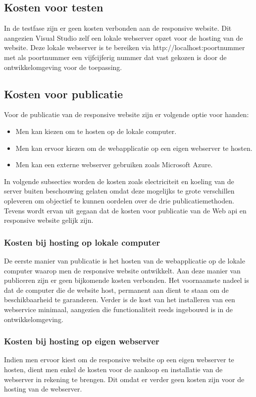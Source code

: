 \subsection{Kosten voor testen}
In de testfase zijn er geen kosten verbonden aan de responsive website. Dit aangezien Visual Studio zelf een lokale webserver opzet
voor de hosting van de website. Deze lokale webserver is te bereiken via http://localhost:poortnummer met als poortnummer een
vijfcijferig nummer dat vast gekozen is door de ontwikkelomgeving voor de toepassing.
\subsection{Kosten voor publicatie}
Voor de publicatie van de responsive website zijn er volgende optie voor handen:
\begin{itemize}
  \item Men kan kiezen om te hosten op de lokale computer.
  \item Men kan ervoor kiezen om de webapplicatie op een eigen webserver te hosten.
  \item Men kan een externe webserver gebruiken zoals Microsoft Azure.
\end{itemize}
In volgende subsecties worden de kosten zoals electriciteit en koeling van de server buiten beschouwing gelaten omdat deze
mogelijks te grote verschillen opleveren om objectief te kunnen oordelen over de drie publicatiemethoden. Tevens wordt ervan uit
gegaan dat de kosten voor publicatie van de Web api en responsive website gelijk zijn.
\subsubsection{Kosten bij hosting op lokale computer}
De eerste manier van publicatie is het hosten van de webapplicatie op de lokale computer waarop men de responsive website
ontwikkelt. Aan deze manier van publiceren zijn er geen bijkomende kosten verbonden. Het voornaamste nadeel is dat de computer
die de website host, permanent aan dient te staan om de beschikbaarheid te garanderen. Verder is de kost van het installeren
van een webservice minimaal, aangezien die functionaliteit reeds ingebouwd is in de ontwikkelomgeving.
\newpage
\subsubsection{Kosten bij hosting op eigen webserver}
Indien men ervoor kiest om de responsive website op een eigen webserver te hosten, dient men enkel de kosten voor de aankoop en installatie van de webserver in rekening te brengen.
Dit omdat er verder geen kosten zijn voor de hosting van de webserver.

